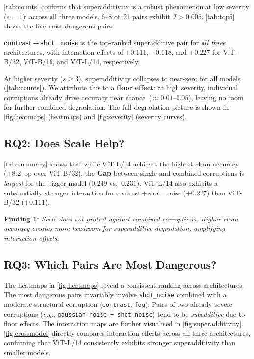 \documentclass[10pt, twocolumn]{article}
\newcommand{\eg}{\textit{e.g.}}
\newcommand{\cI}{\mathcal{I}}          %
\begin{document}
\cref{tab:counts} confirms that superadditivity is a
robust phenomenon at low severity ($s=1$): across all
three models, 6--8 of~21 pairs exhibit $\cI > 0.005$.
\cref{tab:top5} shows the five most dangerous pairs.

\textbf{contrast\,+\,shot\_noise} is the top-ranked
superadditive pair for \emph{all three} architectures,
with interaction effects of $+0.111$, $+0.118$, and
$+0.227$ for ViT-B/32, ViT-B/16, and ViT-L/14,
respectively.

At higher severity ($s \geq 3$), superadditivity
collapses to near-zero for all models
(\cref{tab:counts}).
We attribute this to a \textbf{floor effect}: at
high severity, individual corruptions already drive
accuracy near chance~($\approx 0.01$--$0.05$),
leaving no room for further combined degradation.
The full degradation picture is shown in
\cref{fig:heatmaps} (heatmaps) and
\cref{fig:severity} (severity curves).

\subsection{RQ2: Does Scale Help?}
\label{sec:rq2}

\cref{tab:summary} shows that while ViT-L/14
achieves the highest clean accuracy
(+8.2~pp over ViT-B/32), the \textbf{Gap} between
single and combined corruptions is \emph{largest}
for the bigger model ($0.249$ vs.\ $0.231$).
ViT-L/14 also exhibits a substantially stronger
interaction for contrast\,+\,shot\_noise ($+0.227$)
than ViT-B/32 ($+0.111$).

\noindent\textbf{Finding 1:}
\textit{Scale does not protect against combined
corruptions.
Higher clean accuracy creates more headroom for
superadditive degradation, amplifying interaction
effects.}

\subsection{RQ3: Which Pairs Are Most Dangerous?}
\label{sec:rq3}

The heatmaps in \cref{fig:heatmaps} reveal a
consistent ranking across architectures.
The most dangerous pairs invariably involve
\texttt{shot\_noise} combined with a moderate
structural corruption (\texttt{contrast},
\texttt{fog}).
Pairs of two already-severe corruptions
(\eg, \texttt{gaussian\_noise\,+\,shot\_noise})
tend to be \emph{subadditive} due to floor effects.
The interaction maps are further visualised in
\cref{fig:superadditivity}.
\cref{fig:crossmodel} directly compares interaction
effects across all three architectures, confirming
that ViT-L/14 consistently exhibits stronger
superadditivity than smaller models.
\end{document}
